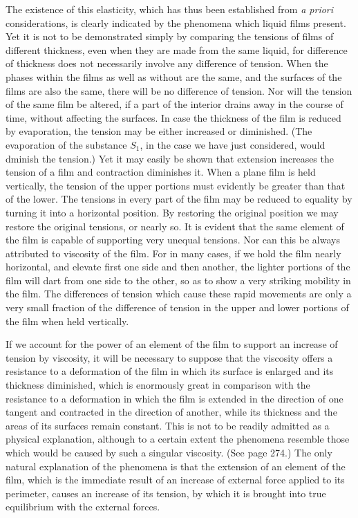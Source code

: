\documentclass[12pt]{article}
\begin{document}
The existence of this elasticity, which has thus been established from \textit{a priori} considerations, is clearly indicated by the phenomena which liquid films present. Yet it is not to be demonstrated simply by comparing the tensions of films of different thickness, even when they are made from the same liquid, for difference of thickness does not necessarily involve any difference of tension. When the phases within the films as well as without are the same, and the surfaces of the films are also the same, there will be no difference of tension. Nor will the tension of the same film be altered, if a part of the interior drains away in the course of time, without affecting the surfaces. In case the thickness of the film is reduced by evaporation, the tension may be either increased or diminished. (The evaporation of the substance $S_1$, in the case we have just considered, would dminish the tension.) Yet it may easily be shown that extension increases the tension of a film and contraction diminishes it. When a plane film is held vertically, the tension of the upper portions must evidently be greater than that of the lower. The tensions in every part of the film may be reduced to equality by turning it into a horizontal position. By restoring the original position we may restore the original tensions, or nearly so. It is evident that the same element of the film is capable of supporting very unequal tensions. Nor can this be always attributed to viscosity of the film. For in many cases, if we hold the film nearly horizontal, and elevate first one side and then another, the lighter portions of the film will dart from one side to the other, so as to show a very striking mobility in the film. The differences of tension which cause these rapid movements are only a very small fraction of the difference of tension in the upper and lower portions of the film when held vertically.

If we account for the power of an element of the film to support an increase of tension by viscosity, it will be necessary to suppose that the viscosity offers a resistance to a deformation of the film in which its surface is enlarged and its thickness diminished, which is enormously great in comparison with the resistance to a deformation in which the film is extended in the direction of one tangent and contracted in the direction of another, while its thickness and the areas of its surfaces remain constant. This is not to be readily admitted as a physical explanation, although to a certain extent the phenomena resemble those which would be caused by such a singular viscosity. (See page 274.) The only natural explanation of the phenomena is that the extension of an element of the film, which is the immediate result of an increase of external force applied to its perimeter, causes an increase of its tension, by which it is brought into true equilibrium with the external forces.
\end{document}
